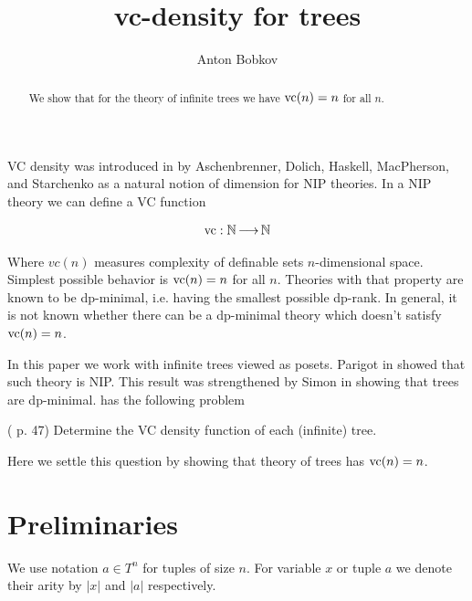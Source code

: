 \documentclass{amsart}
\begin{document}
\title{vc-density for trees}
\author{Anton Bobkov}

\begin{abstract}
	We show that for the theory of infinite trees we have $\operatorname{vc}(n) = n$ for all $n$.
\end{abstract}

\maketitle

VC density was introduced in \cite{vc_density} by Aschenbrenner, Dolich, Haskell, MacPherson, and Starchenko as a natural notion of dimension for NIP theories. In a NIP theory we can define a VC function

\begin{align*}
	\operatorname{vc} : \mathbb{N} \operatorname{\longrightarrow} \mathbb{N}
\end{align*}

Where $vc(n)$ measures complexity of definable sets $n$-dimensional space. Simplest possible behavior is $\operatorname{vc}(n) = n$ for all $n$. Theories with that property are known to be dp-minimal, i.e. having the smallest possible dp-rank. In general, it is not known whether there can be a dp-minimal theory which doesn't satisfy $\operatorname{vc}(n)=n$.

In this paper we work with infinite trees viewed as posets. Parigot in \cite{parigot_trees} showed that such theory is NIP. This result was strengthened by Simon in \cite{simon_dp_min} showing that trees are dp-minimal. \cite{vc_density} has the following problem 

\begin{Problem} (\cite{vc_density} p. 47)
	Determine the VC density function of each (infinite) tree.
\end{Problem}

Here we settle this question by showing that theory of trees has $\operatorname{vc}(n) = n$.

\section{Preliminaries}
We use notation $a \in T^n$ for tuples of size $n$. For variable $x$ or tuple $a$ we denote their arity by $|x|$ and $|a|$ respectively.
\end{document}
